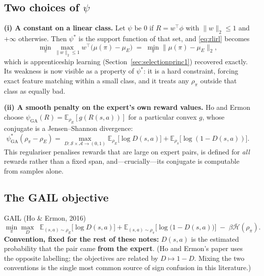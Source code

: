 \documentclass[11pt]{article}
\theoremstyle{plain}
\theoremstyle{definition}
\theoremstyle{remark}
\renewcommand{\S}{\mathcal{S}}
\newcommand{\A}{\mathcal{A}}
\newcommand{\E}{\mathbb{E}}
\newcommand{\GA}{\mathrm{GA}}
\begin{document}
\subsection{Two choices of $\psi$}

\textbf{(i) A constant on a linear class.} Let $\psi$ be $0$ if $R=w^\top
\phi$ with $\|w\|_2\le1$ and $+\infty$ otherwise. Then $\psi^*$ is the
support function of that set, and \eqref{eq:rlirl} becomes
\begin{equation}
\min_\pi \max_{\|w\|_2\le1} w^\top\big(\mu(\pi)-\mu_E\big) \;=\; \min_\pi
\|\mu(\pi)-\mu_E\|_2,
\label{eq:psilinear}
\end{equation}
which is apprenticeship learning (Section~\ref{sec:selectionprinc1})
recovered exactly. Its weakness is now visible as a property of $\psi^*$:
it is a hard constraint, forcing exact feature matching within a small
class, and it treats any $\rho_\pi$ outside that class as equally bad.

\textbf{(ii) A smooth penalty on the expert's own reward values.} Ho and
Ermon choose $\psi_{\GA}(R) = \E_{\rho_E}[g(R(s,a))]$ for a particular
convex $g$, whose conjugate is a Jensen--Shannon divergence:
\begin{equation}
\psi_{\GA}^*(\rho_\pi-\rho_E) = \max_{D:\S\times\A\to(0,1)}
\E_{\rho_E}\big[\log D(s,a)\big] + \E_{\rho_\pi}\big[\log(1-D(s,a))\big].
\label{eq:psiGA}
\end{equation}
This regulariser penalises rewards that are large on expert pairs, is
defined for \emph{all} rewards rather than a fixed span, and---crucially---its
conjugate is computable from samples alone.

\subsection{The GAIL objective}

\begin{graybox}{GAIL (Ho \& Ermon, 2016)}
\begin{equation}
\min_\pi \max_D \;\; \E_{(s,a)\sim\rho_E}\big[\log D(s,a)\big] +
\E_{(s,a)\sim\rho_\pi}\big[\log\big(1-D(s,a)\big)\big] \;-\;
\beta\bar{\mathcal{H}}(\rho_\pi).
\label{eq:gailobjective}
\end{equation}
\textbf{Convention, fixed for the rest of these notes:} $D(s,a)$ is the
estimated probability that the pair came \textbf{from the expert}. (Ho and
Ermon's paper uses the opposite labelling; the objectives are related by
$D\mapsto1-D$. Mixing the two conventions is the single most common source
of sign confusion in this literature.)
\end{graybox}
\end{document}
